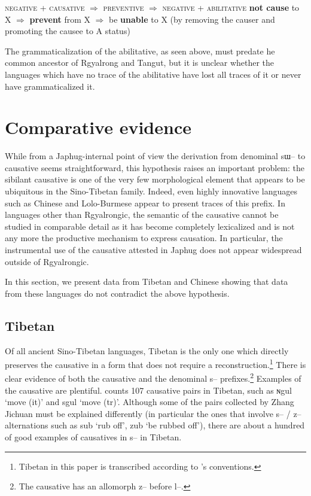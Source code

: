 \documentclass[oldfontcommands,oneside,a4paper,11pt]{article}
\newcommand{\ipa}[1]{{\phon \mbox{#1}}} %
\begin{document}
{\small
\begin{exe}
\ex \label{ex:pathway2}
\glt \textsc{negative}   + \textsc{causative} $\Rightarrow$ \textsc{preventive} $\Rightarrow$ \textsc{negative} +  \textsc{abilitative} 
\glt \textbf{not cause} to X $\Rightarrow$ \textbf{prevent} from X $\Rightarrow$ be \textbf{unable} to X (by removing the causer and promoting the causee to A status)
\end{exe}
}


The grammaticalization of the abilitative, as seen above, must predate he common ancestor of Rgyalrong and Tangut, but it is unclear whether the languages which have no trace of the abilitative have lost all traces of it or never have grammaticalized it.

\section{Comparative evidence}

 While from a Japhug-internal point of view the derivation from denominal \ipa{sɯ--} to causative seems straightforward, this hypothesis raises an important problem:  the sibilant causative is one of the very few morphological element that appears to be ubiquitous in the Sino-Tibetan family. Indeed, even highly innovative languages such as Chinese and Lolo-Burmese appear to present  traces of this prefix. In languages other than Rgyalrongic, the semantic of the causative cannot be studied in comparable detail as it has become completely lexicalized and is not any more the productive mechanism to express causation. In particular, the instrumental use of the causative attested in Japhug does not appear widespread outside of Rgyalrongic.
 
 In this section, we present data from Tibetan and Chinese showing that data from these languages do not contradict the above hypothesis.

 
\subsection{Tibetan}

Of all ancient Sino-Tibetan languages, Tibetan is the only one which directly preserves the causative in a form that does not require a reconstruction.\footnote{Tibetan in this paper is transcribed according to \citet{jacques12transcription}'s conventions.} There is clear evidence of both the causative and the denominal \ipa{s--} prefixes.\footnote{The causative has an allomorph \ipa{z--} before \ipa{l--}.}  Examples of the causative are plentiful. \citet[210-8]{zhang09cizu} counts 107 causative pairs in Tibetan, such as \ipa{ɴgul} `move (it)' and \ipa{sgul} `move (tr)'. Although some of the pairs collected by Zhang Jichuan must be explained differently (in particular the ones that involve \ipa{s--} / \ipa{z--} alternations such as \ipa{sub} `rub off', \ipa{zub} `be rubbed off'), there are about a hundred of good examples of causatives in \ipa{s--} in Tibetan.
\end{document}
